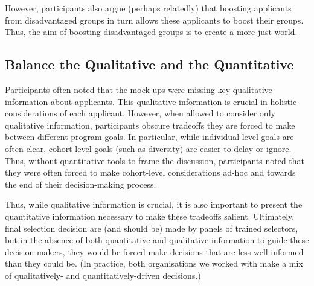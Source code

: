 However, participants also argue (perhaps relatedly) that boosting applicants from disadvantaged groups in turn allows these applicants to boost their groups. Thus, the aim of boosting disadvantaged groups is to create a more just world.

\subsection{Balance the Qualitative and the Quantitative}
Participants often noted that the mock-ups were missing key qualitative information about applicants. This qualitative information is crucial in holistic considerations of each applicant. However, when allowed to consider only qualitative information, participants obscure tradeoffs they are forced to make between different program goals. In particular, while individual-level goals are often clear, cohort-level goals (such as diversity) are easier to delay or ignore. Thus, without quantitative tools to frame the discussion, participants noted that they were often forced to make cohort-level considerations ad-hoc and towards the end of their decision-making process.

Thus, while qualitative information is crucial, it is also important to present the quantitative information necessary to make these tradeoffs salient. Ultimately, final selection decision are (and should be) made by panels of trained selectors, but in the absence of both quantitative and qualitative information to guide these decision-makers, they would be forced make decisions that are less well-informed than they could be. (In practice, both organisations we worked with make a mix of qualitatively- and quantitatively-driven decisions.)
